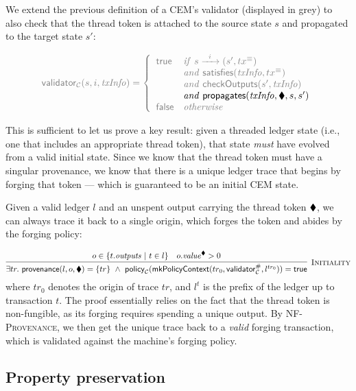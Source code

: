 We extend the previous definition of a CEM's validator (displayed in
grey) to also check that the thread token is attached to the source
state $s$ and propagated to the target state $s'$:

\begin{displaymath}
\color{gray}
\valC(s, i, \mi{txInfo}) = \left\{
  \begin{array}{ll}
  \true  & \mi{if}  \ \CStep{s} \\
         & \mi{and} \ \satisfies(\mi{txInfo}, \txeq) \\
         & \mi{and} \ \checkOutputs(s', \mi{txInfo}) \\
         & \begingroup\color{black}
           \mi{and} \ \s{propagates}(\mi{txInfo}, \nft, s, s')
           \endgroup \\
  \false & \mi{otherwise}
  \end{array}
\right.
\end{displaymath}

This is sufficient to let us prove a key result: given a threaded ledger
state (i.e., one that includes an appropriate thread token), that state
\emph{must} have evolved from a valid initial state.  Since we know
that the thread token must have a singular provenance, we know that
there is a unique ledger trace that begins by forging that token
--- which is guaranteed to be an initial CEM state.

\begin{proposition}[Initiality]
Given a valid ledger $l$ and an unspent output carrying the thread
token $\blacklozenge$, we can always trace it back to a single origin, which
forges the token and abides by the forging policy:
\end{proposition}
%
\begin{displaymath}
\infer[\textsc{Initiality}]
  { \exists tr. \ \s{provenance}(l, o, \nft) = \{ tr \}
  \ \land \
    \polC(\mkMpsContext(tr_0, \hash{\valC}, l^{tr_0})) = \true
  }
  {%
    o \in \{ t.\outputs \ | \ t \in l \}
  & o.\val^\nft > 0
  }
\end{displaymath}
%
where $tr_0$ denotes the origin of trace $tr$,
and $l^t$ is the prefix of the ledger up to transaction $t$.
The proof essentially relies on the fact that the thread token is
non-fungible, as its forging requires spending a unique output.
By \textsc{NF-Provenance}, we then get the unique trace back to a
\textit{valid} forging transaction, which is validated against the
machine's forging policy.

\subsection{Property preservation}

